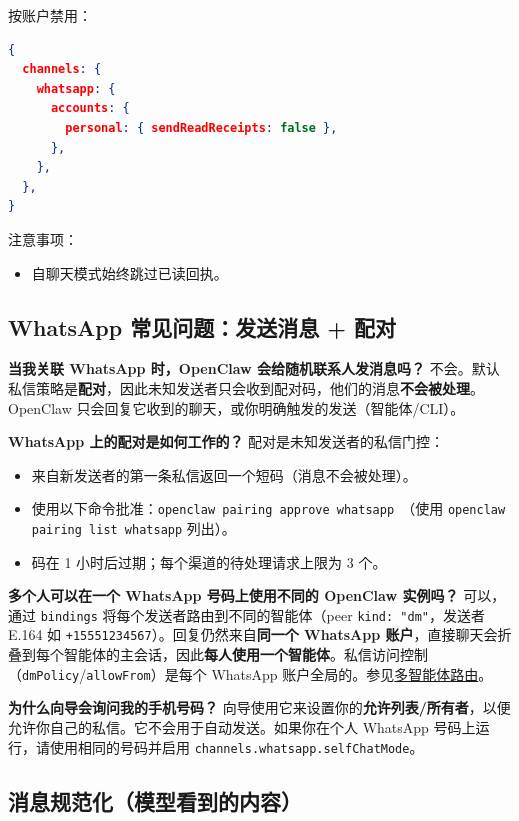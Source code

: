 按账户禁用：

\begin{lstlisting}[language=json]
{
  channels: {
    whatsapp: {
      accounts: {
        personal: { sendReadReceipts: false },
      },
    },
  },
}
\end{lstlisting}


注意事项：

\begin{itemize}
  \item 自聊天模式始终跳过已读回执。
\end{itemize}


\subsection{WhatsApp 常见问题：发送消息 + 配对}


\textbf{当我关联 WhatsApp 时，OpenClaw 会给随机联系人发消息吗？}
不会。默认私信策略是\textbf{配对}，因此未知发送者只会收到配对码，他们的消息\textbf{不会被处理}。OpenClaw 只会回复它收到的聊天，或你明确触发的发送（智能体/CLI）。

\textbf{WhatsApp 上的配对是如何工作的？}
配对是未知发送者的私信门控：

\begin{itemize}
  \item 来自新发送者的第一条私信返回一个短码（消息不会被处理）。
  \item 使用以下命令批准：\texttt{openclaw pairing approve whatsapp }（使用 \texttt{openclaw pairing list whatsapp} 列出）。
  \item 码在 1 小时后过期；每个渠道的待处理请求上限为 3 个。
\end{itemize}


\textbf{多个人可以在一个 WhatsApp 号码上使用不同的 OpenClaw 实例吗？}
可以，通过 \texttt{bindings} 将每个发送者路由到不同的智能体（peer \texttt{kind: "dm"}，发送者 E.164 如 \texttt{+15551234567}）。回复仍然来自\textbf{同一个 WhatsApp 账户}，直接聊天会折叠到每个智能体的主会话，因此\textbf{每人使用一个智能体}。私信访问控制（\texttt{dmPolicy}/\texttt{allowFrom}）是每个 WhatsApp 账户全局的。参见\href{/concepts/multi-agent}{多智能体路由}。

\textbf{为什么向导会询问我的手机号码？}
向导使用它来设置你的\textbf{允许列表/所有者}，以便允许你自己的私信。它不会用于自动发送。如果你在个人 WhatsApp 号码上运行，请使用相同的号码并启用 \texttt{channels.whatsapp.selfChatMode}。

\subsection{消息规范化（模型看到的内容）}


